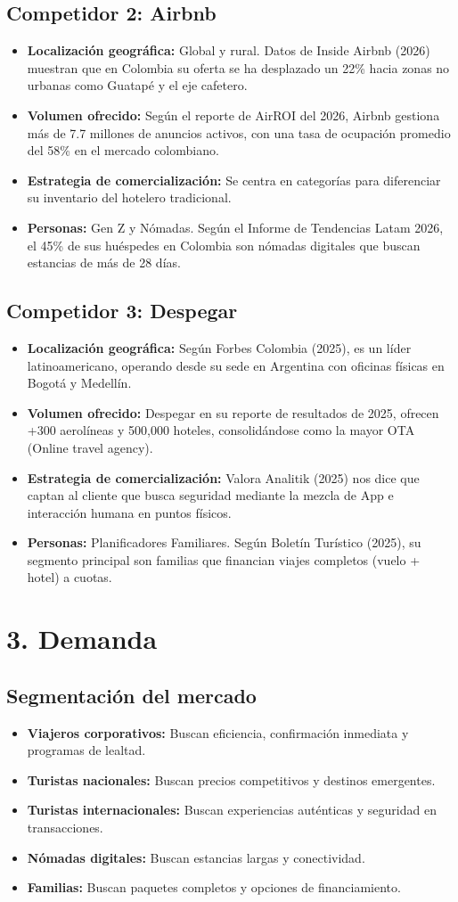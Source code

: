 \documentclass[12pt,a4paper]{article}
\newcommand{\sectiontitle}[1]{\section{#1}}
\newcommand{\subsectiontitle}[1]{\subsection{#1}}
\begin{document}
\subsectiontitle{Competidor 2: Airbnb}

\begin{itemize}
    \item \textbf{Localización geográfica:} Global y rural. Datos de Inside Airbnb (2026) muestran que en Colombia su oferta se ha desplazado un 22\% hacia zonas no urbanas como Guatapé y el eje cafetero.
    \item \textbf{Volumen ofrecido:} Según el reporte de AirROI del 2026, Airbnb gestiona más de 7.7 millones de anuncios activos, con una tasa de ocupación promedio del 58\% en el mercado colombiano.
    \item \textbf{Estrategia de comercialización:} Se centra en categorías para diferenciar su inventario del hotelero tradicional.
    \item \textbf{Personas:} Gen Z y Nómadas. Según el Informe de Tendencias Latam 2026, el 45\% de sus huéspedes en Colombia son nómadas digitales que buscan estancias de más de 28 días.
\end{itemize}

\subsectiontitle{Competidor 3: Despegar}

\begin{itemize}
    \item \textbf{Localización geográfica:} Según Forbes Colombia (2025), es un líder latinoamericano, operando desde su sede en Argentina con oficinas físicas en Bogotá y Medellín.
    \item \textbf{Volumen ofrecido:} Despegar en su reporte de resultados de 2025, ofrecen +300 aerolíneas y 500,000 hoteles, consolidándose como la mayor OTA (Online travel agency).
    \item \textbf{Estrategia de comercialización:} Valora Analitik (2025) nos dice que captan al cliente que busca seguridad mediante la mezcla de App e interacción humana en puntos físicos.
    \item \textbf{Personas:} Planificadores Familiares. Según Boletín Turístico (2025), su segmento principal son familias que financian viajes completos (vuelo + hotel) a cuotas.
\end{itemize}

\sectiontitle{3. Demanda}

\subsectiontitle{Segmentación del mercado}

\begin{itemize}
    \item \textbf{Viajeros corporativos:} Buscan eficiencia, confirmación inmediata y programas de lealtad.
    \item \textbf{Turistas nacionales:} Buscan precios competitivos y destinos emergentes.
    \item \textbf{Turistas internacionales:} Buscan experiencias auténticas y seguridad en transacciones.
    \item \textbf{Nómadas digitales:} Buscan estancias largas y conectividad.
    \item \textbf{Familias:} Buscan paquetes completos y opciones de financiamiento.
\end{itemize}
\end{document}
